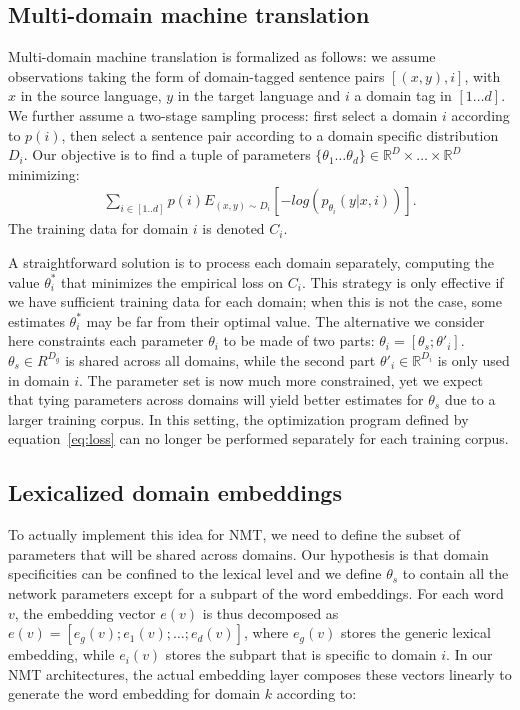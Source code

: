 \subsection{Multi-domain machine translation \label{ssec:statement}}

Multi-domain machine translation is formalized as follows: we assume observations taking the form of  domain-tagged sentence pairs $[(x,y),i]$, with $x$ in the source language, $y$ in the target language and $i$ a domain tag in $[1\dots d]$. We further assume a two-stage sampling process: first select a domain $i$ according to $p(i)$, then select a sentence pair according to a domain specific distribution $D_i$. Our objective is to find a tuple of parameters $\{\theta_1 \dots \theta_d \} \in \mathbb{R}^D \times \dots \times \mathbb{R}^D$ minimizing:
\begin{equation} \label{eq:loss}
\begin{split}
\sum_{i \in [1..d]} p(i) E_{(x,y) \sim D_{i}} [-log(p_{\theta_i}(y|x,i))] \text{.}
\end{split}
\end{equation}
The training data for domain $i$ is denoted $C_i$.

A straightforward solution is to process each domain separately, computing the value $\theta_i^*$ that minimizes the empirical loss on $C_i$. This strategy is only effective if we have sufficient training data for each domain; when this is not the case, some estimates $\theta_i^*$ may be far from their optimal value. 
The alternative we consider here constraints each parameter $\theta_i$ to be made of two parts: $\theta_i = [\theta_s; \theta'_i]$. $\theta_s \in R^{D_g}$ is shared across all domains, while the second part $\theta'_i \in \mathbb{R}^{D_i}$ is only used in domain $i$.
The parameter set is now much more constrained, yet we expect that tying parameters across domains will yield better estimates for $\theta_s$ due to a larger training corpus. In this setting, the optimization program defined by equation~\eqref{eq:loss} can no longer be performed separately for each training corpus.

\subsection{Lexicalized domain embeddings \label{ssec:lde}}

To actually implement this idea for NMT, we need to define the subset of parameters that will be shared across domains. 
Our hypothesis is that domain specificities can be confined to the lexical level and we define $\theta_s$ to contain all the network parameters except for a subpart of the word embeddings. 
For each word $v$, the embedding vector $e(v)$ is thus decomposed as $e(v) = [e_g(v); e_1(v); \dots; e_d(v)]$, where $e_g(v)$ stores the generic lexical embedding, while $e_i(v)$ stores the subpart that is specific to domain $i$.
In our NMT architectures, the actual embedding layer composes these vectors linearly to generate the word embedding for domain $k$ according to:

